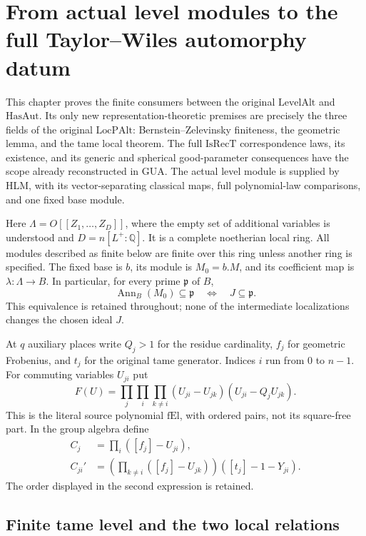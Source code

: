 \documentclass[11pt,a4paper]{article}
\numberwithin{equation}{section}
\theoremstyle{remark}\newtheorem{remark}[theorem]{Remark}
\begin{document}
\section{From actual level modules to the full Taylor--Wiles automorphy datum}
\label{sec:hida-taylor-wiles-v45}

This chapter proves the finite consumers between the original
\(\mathrm{LevelAlt}\) and \(\mathrm{HasAut}\).  Its only new
representation-theoretic premises are precisely the three fields
of the original \(\mathrm{LocPAlt}\): Bernstein--Zelevinsky
finiteness, the geometric lemma, and the tame local theorem.
The full \(\mathrm{IsRecT}\) correspondence laws, its existence,
and its generic and spherical good-parameter consequences have
the scope already reconstructed in GUA.  The actual level module
is supplied by HLM, with its vector-separating classical maps,
full polynomial-law comparisons, and one fixed base module.

Here \(\Lambda=O[[Z_1,\ldots,Z_D]]\), where the empty set of
additional variables is understood and \(D=n[L^+:\mathbb Q]\).
It is a complete noetherian local ring.  All modules described as
finite below are finite over this ring unless another ring is
specified.  The fixed base is \(b\), its module is \(M_0=b.M\),
and its coefficient map is \(\lambda:\Lambda\to B\).  In
particular, for every prime \(\mathfrak p\) of \(B\),
\[
 \operatorname{Ann}_B(M_0)\subseteq\mathfrak p
       \quad\Longleftrightarrow\quad J\subseteq\mathfrak p .
 \tag{HTW.1}
\]
This equivalence is retained throughout; none of the intermediate
localizations changes the chosen ideal \(J\).

At \(q\) auxiliary places write \(Q_j>1\) for the residue
cardinality, \(f_j\) for geometric Frobenius, and \(t_j\) for
the original tame generator.  Indices \(i\) run from \(0\) to
\(n-1\).  For commuting variables \(U_{ji}\) put
\[
 F(U)=\prod_j\prod_i\prod_{k\ne i}
             (U_{ji}-U_{jk})(U_{ji}-Q_jU_{jk}).
 \tag{HTW.2}
\]
This is the literal source polynomial \(\mathrm{fEl}\), with
ordered pairs, not its square-free part.  In the group algebra
define
\[
 \begin{split}
 C_j&=\prod_i([f_j]-U_{ji}),\\
 C_{ji}'&=\left(\prod_{k\ne i}([f_j]-U_{jk})\right)
                                      ([t_j]-1-Y_{ji}).
 \end{split}
 \tag{HTW.3}
\]
The order displayed in the second expression is retained.

\subsection{Finite tame level and the two local relations}
\end{document}
